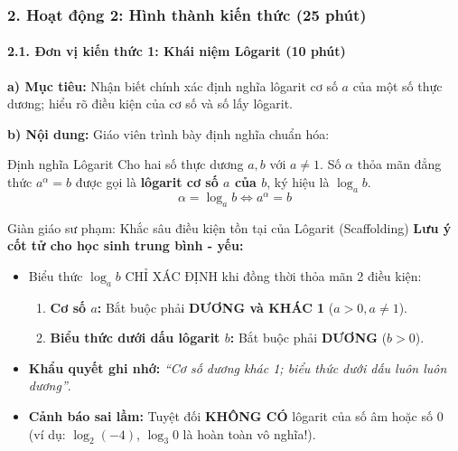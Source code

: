 \documentclass[12pt, a4paper]{article}
\begin{document}
\subsubsection*{2. Hoạt động 2: Hình thành kiến thức (25 phút)}

\paragraph{2.1. Đơn vị kiến thức 1: Khái niệm Lôgarit (10 phút)}

\noindent \textbf{a) Mục tiêu:}
Nhận biết chính xác định nghĩa lôgarit cơ số $a$ của một số thực dương; hiểu rõ điều kiện của cơ số và số lấy lôgarit.

\noindent \textbf{b) Nội dung:}
Giáo viên trình bày định nghĩa chuẩn hóa:
\begin{pedabox}{Định nghĩa Lôgarit}
Cho hai số thực dương $a, b$ với $a \neq 1$.
Số $\alpha$ thỏa mãn đẳng thức $a^\alpha = b$ được gọi là \textbf{lôgarit cơ số $a$ của $b$}, ký hiệu là $\log_a b$.
$$\alpha = \log_a b \iff a^\alpha = b$$
\end{pedabox}

\begin{scaffoldbox}{Giàn giáo sư phạm: Khắc sâu điều kiện tồn tại của Lôgarit (Scaffolding)}
\textbf{Lưu ý cốt tử cho học sinh trung bình - yếu:}
\begin{itemize}
    \item Biểu thức $\log_a b$ CHỈ XÁC ĐỊNH khi đồng thời thỏa mãn 2 điều kiện:
    \begin{enumerate}[leftmargin=0.6cm]
        \item \textbf{Cơ số $a$:} Bắt buộc phải \textbf{DƯƠNG và KHÁC 1} ($a > 0, a \neq 1$).
        \item \textbf{Biểu thức dưới dấu lôgarit $b$:} Bắt buộc phải \textbf{DƯƠNG} ($b > 0$).
    \end{enumerate}
    \item \textbf{Khẩu quyết ghi nhớ:} \textit{``Cơ số dương khác 1; biểu thức dưới dấu luôn luôn dương''}.
    \item \textbf{Cảnh báo sai lầm:} Tuyệt đối \textbf{KHÔNG CÓ} lôgarit của số âm hoặc số $0$ (ví dụ: $\log_2 (-4)$, $\log_3 0$ là hoàn toàn vô nghĩa!).
\end{itemize}
\end{scaffoldbox}
\end{document}
